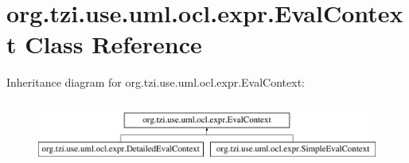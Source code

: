 \hypertarget{classorg_1_1tzi_1_1use_1_1uml_1_1ocl_1_1expr_1_1_eval_context}{\section{org.\-tzi.\-use.\-uml.\-ocl.\-expr.\-Eval\-Context Class Reference}
\label{classorg_1_1tzi_1_1use_1_1uml_1_1ocl_1_1expr_1_1_eval_context}
}
Inheritance diagram for org.\-tzi.\-use.\-uml.\-ocl.\-expr.\-Eval\-Context\-:\begin{figure}[H]
\begin{center}
\leavevmode
\includegraphics[height=2.000000cm]{classorg_1_1tzi_1_1use_1_1uml_1_1ocl_1_1expr_1_1_eval_context}
\end{center}
\end{figure}
